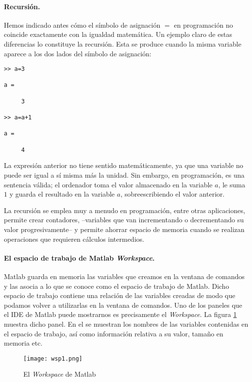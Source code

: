 \paragraph*{Recursión.}  Hemos indicado antes cómo el símbolo de asignación $=$ en programación no coincide exactamente con la igualdad matemática. Un ejemplo claro de estas diferencias lo constituye la recursión. Esta se produce cuando la misma variable aparece a los dos lados del símbolo de asignación:
\begin{verbatim}
>> a=3

a =

     3

>> a=a+1

a =

     4
\end{verbatim} 
La expresión anterior no tiene sentido matemáticamente, ya que una variable no puede ser igual a sí misma más la unidad. Sin embargo, en programación, es  una sentencia válida; el ordenador toma el valor almacenado en la variable $a$, le suma $1$ y guarda el resultado en la variable $a$, sobreescribiendo el valor anterior.

La recursión se emplea muy a menudo en programación, entre otras aplicaciones, permite crear contadores, --variables que van incrementando o decrementando su valor progresivamente--  y permite ahorrar espacio de memoria cuando se realizan operaciones que requieren cálculos intermedios.

\paragraph*{El espacio de trabajo de Matlab \emph{Workspace}.}  Matlab guarda en memoria las variables que creamos en la ventana de comandos y las asocia a lo que se conoce como el espacio de trabajo de Matlab. Dicho espacio de trabajo contiene una relación de las variables creadas de modo que podamos volver a utilizarlas en la ventana de comandos. Uno de los paneles que el IDE de Matlab puede mostrarnos es precisamente el \emph{Workspace}. La figura \ref{fig:wsp} muestra dicho panel.  En el se muestran los nombres de las variables contenidas en el espacio de trabajo, así como información relativa a su valor, tamaño en memoria etc.


\begin{figure}[h]
	\centering
		\texttt{[image: wsp1.png]}
	\caption{El \emph{Workspace} de Matlab}
	\label{fig:wsp}
\end{figure}

